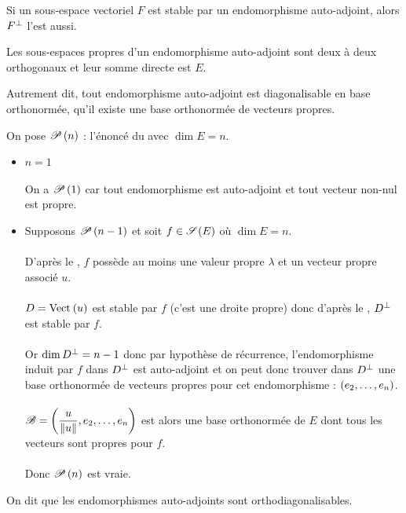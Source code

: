 \begin{lem}
Si un sous-espace vectoriel \(F\) est stable par un endomorphisme auto-adjoint, alors \(F\ortho\) l'est aussi.
\end{lem}

\begin{theo}
Les sous-espaces propres d'un endomorphisme auto-adjoint sont deux à deux orthogonaux et leur somme directe est \(E\).

Autrement dit, tout endomorphisme auto-adjoint est diagonalisable en base orthonormée, \cad qu'il existe une base orthonormée de vecteurs propres.
\end{theo}

\begin{dem}
On pose \(\P{n}\) : l'énoncé du  avec \(\dim E=n\).

\begin{itemize}
    \item \(n=1\) \\\\ On a \(\P{1}\) car tout endomorphisme est auto-adjoint et tout vecteur non-nul est propre. \\
    \item Supposons \(\P{n-1}\) et soit \(f\in\sym{}[E]\) où \(\dim E=n\). \\\\ D'après le , \(f\) possède au moins une valeur propre \(\lambda\) et un vecteur propre associé \(u\). \\\\ \(D=\Vect{u}\) est stable par \(f\) (c'est une droite propre) donc d'après le , \(D\ortho\) est stable par \(f\). \\\\ Or \(\dim D\ortho=n-1\) donc par hypothèse de récurrence, l'endomorphisme induit par \(f\) dans \(D\ortho\) est auto-adjoint et on peut donc trouver dans \(D\ortho\) une base orthonormée de vecteurs propres pour cet endomorphisme : \(\paren{e_2,\dots,e_n}\). \\\\ \(\fami{B}=\paren{\dfrac{u}{\norme{u}},e_2,\dots,e_n}\) est alors une base orthonormée de \(E\) dont tous les vecteurs sont propres pour \(f\). \\\\ Donc \(\P{n}\) est vraie.
\end{itemize}
\end{dem}

On dit que les endomorphismes auto-adjoints sont orthodiagonalisables.


